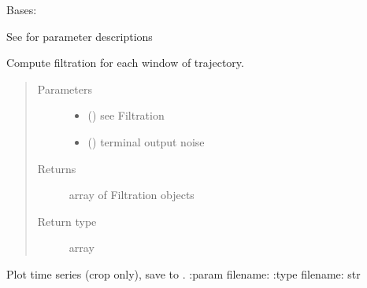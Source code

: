\documentclass[letterpaper,10pt,openany,oneside,english]{sphinxmanual}
\begin{document}
\begin{fulllineitems}
\label{\detokenize{signals:signals.Trajectory}}
Bases: 

See {\hyperref[\detokenize{signals:signals.BaseTrajectory}]{}} for parameter descriptions

\begin{fulllineitems}
\label{\detokenize{signals:signals.Trajectory.filtrations}}
Compute filtration for each window of trajectory.
\begin{quote}\begin{description}
\item[{Parameters}] \leavevmode\begin{itemize}
\item {} 
 () \textendash{} see Filtration

\item {} 
 () \textendash{} terminal output noise

\end{itemize}

\item[{Returns}] \leavevmode
array of Filtration objects

\item[{Return type}] \leavevmode
array

\end{description}\end{quote}

\end{fulllineitems}


\begin{fulllineitems}
\label{\detokenize{signals:signals.Trajectory.plot}}
Plot time series (crop only), save to .
:param filename:
:type filename: str

\end{fulllineitems}


\end{fulllineitems}
\end{document}
